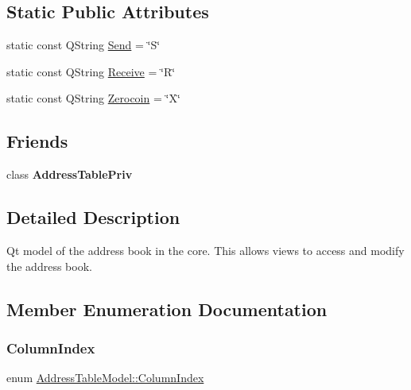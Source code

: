 \subsection*{Static Public Attributes}
\begin{DoxyCompactItemize}
\item 
static const Q\+String \mbox{\hyperlink{class_address_table_model_a7c74e158d014a757c2edcc5bcb1e9a62}{Send}} = \char`\"{}S\char`\"{}
\item 
static const Q\+String \mbox{\hyperlink{class_address_table_model_acaed83193545456eab47dd7be1d2ceba}{Receive}} = \char`\"{}R\char`\"{}
\item 
static const Q\+String \mbox{\hyperlink{class_address_table_model_a8792d7ee2440aa349488ed6a369e50b6}{Zerocoin}} = \char`\"{}X\char`\"{}
\end{DoxyCompactItemize}
\subsection*{Friends}
\begin{DoxyCompactItemize}
\item 
\mbox{\label{class_address_table_model_aa3f1055879193511b3a0088db8c1d9ec}} 
class {\bfseries Address\+Table\+Priv}
\end{DoxyCompactItemize}


\subsection{Detailed Description}
Qt model of the address book in the core. This allows views to access and modify the address book. 

\subsection{Member Enumeration Documentation}
\mbox{\label{class_address_table_model_a432276ac4504e926466072561c5ddb33}} 
\subsubsection{\texorpdfstring{Column\+Index}{ColumnIndex}}
{\footnotesize\ttfamily enum \mbox{\hyperlink{class_address_table_model_a432276ac4504e926466072561c5ddb33}{Address\+Table\+Model\+::\+Column\+Index}}}

